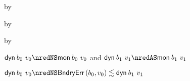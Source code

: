 {\begin{lamportproof*}
    \begin{pfproof}
      \absurdstep
        \begin{pfproof}
          by 
        \end{pfproof}
    \end{pfproof}

    \begin{pfproof}
      \absurdstep
        \begin{pfproof}
          by 
        \end{pfproof}
    \end{pfproof}

    \begin{pfproof}
      \absurdstep
        \begin{pfproof}
          by 
        \end{pfproof}
    \end{pfproof}

    \begin{pfproof}
        \begin{pfproof}
          \qedstep
            \begin{pfproof}
              $\edynb{\sbnd_0}{\svalue_0} \nredNS \emon{\sbnd_0}{\svalue_0}$
              and
              $\edynb{\sbnd_1}{\svalue_1} \nredAS \emon{\sbnd_1}{\svalue_1}$
            \end{pfproof}
        \end{pfproof}
        \begin{pfproof}
          \qedstep
            \begin{pfproof}
              $\edynb{\sbnd_0}{\svalue_0} \nredNS \rexpr{\boundaryerror{\sbnd_0}{\svalue_0}}{\edynb{\sbnd_1}{\svalue_1}}$
            \end{pfproof}
        \end{pfproof}
    \end{pfproof}


\end{lamportproof*}}
